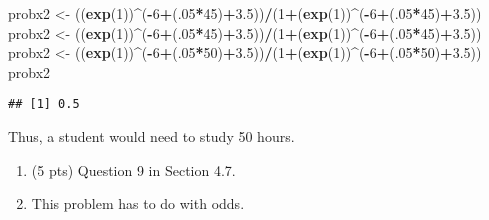 \documentclass[]{article}
\newenvironment{Shaded}{\begin{snugshade}}{\end{snugshade}}
\newcommand{\KeywordTok}[1]{\textcolor[rgb]{0.13,0.29,0.53}{\textbf{#1}}}
\newcommand{\DecValTok}[1]{\textcolor[rgb]{0.00,0.00,0.81}{#1}}
\newcommand{\FloatTok}[1]{\textcolor[rgb]{0.00,0.00,0.81}{#1}}
\newcommand{\StringTok}[1]{\textcolor[rgb]{0.31,0.60,0.02}{#1}}
\newcommand{\OperatorTok}[1]{\textcolor[rgb]{0.81,0.36,0.00}{\textbf{#1}}}
\newcommand{\NormalTok}[1]{#1}
\begin{document}
\begin{Shaded}
\begin{Highlighting}[]
\NormalTok{probx2 <-}\StringTok{ }\NormalTok{((}\KeywordTok{exp}\NormalTok{(}\DecValTok{1}\NormalTok{))}\OperatorTok{^}\NormalTok{(}\OperatorTok{-}\DecValTok{6}\OperatorTok{+}\NormalTok{(.}\DecValTok{05}\OperatorTok{*}\DecValTok{45}\NormalTok{)}\OperatorTok{+}\FloatTok{3.5}\NormalTok{))}\OperatorTok{/}\NormalTok{(}\DecValTok{1}\OperatorTok{+}\NormalTok{(}\KeywordTok{exp}\NormalTok{(}\DecValTok{1}\NormalTok{))}\OperatorTok{^}\NormalTok{(}\OperatorTok{-}\DecValTok{6}\OperatorTok{+}\NormalTok{(.}\DecValTok{05}\OperatorTok{*}\DecValTok{45}\NormalTok{)}\OperatorTok{+}\FloatTok{3.5}\NormalTok{))}
\NormalTok{probx2 <-}\StringTok{ }\NormalTok{((}\KeywordTok{exp}\NormalTok{(}\DecValTok{1}\NormalTok{))}\OperatorTok{^}\NormalTok{(}\OperatorTok{-}\DecValTok{6}\OperatorTok{+}\NormalTok{(.}\DecValTok{05}\OperatorTok{*}\DecValTok{45}\NormalTok{)}\OperatorTok{+}\FloatTok{3.5}\NormalTok{))}\OperatorTok{/}\NormalTok{(}\DecValTok{1}\OperatorTok{+}\NormalTok{(}\KeywordTok{exp}\NormalTok{(}\DecValTok{1}\NormalTok{))}\OperatorTok{^}\NormalTok{(}\OperatorTok{-}\DecValTok{6}\OperatorTok{+}\NormalTok{(.}\DecValTok{05}\OperatorTok{*}\DecValTok{45}\NormalTok{)}\OperatorTok{+}\FloatTok{3.5}\NormalTok{))}
\NormalTok{probx2 <-}\StringTok{ }\NormalTok{((}\KeywordTok{exp}\NormalTok{(}\DecValTok{1}\NormalTok{))}\OperatorTok{^}\NormalTok{(}\OperatorTok{-}\DecValTok{6}\OperatorTok{+}\NormalTok{(.}\DecValTok{05}\OperatorTok{*}\DecValTok{50}\NormalTok{)}\OperatorTok{+}\FloatTok{3.5}\NormalTok{))}\OperatorTok{/}\NormalTok{(}\DecValTok{1}\OperatorTok{+}\NormalTok{(}\KeywordTok{exp}\NormalTok{(}\DecValTok{1}\NormalTok{))}\OperatorTok{^}\NormalTok{(}\OperatorTok{-}\DecValTok{6}\OperatorTok{+}\NormalTok{(.}\DecValTok{05}\OperatorTok{*}\DecValTok{50}\NormalTok{)}\OperatorTok{+}\FloatTok{3.5}\NormalTok{))}
\NormalTok{probx2}
\end{Highlighting}
\end{Shaded}

\begin{verbatim}
## [1] 0.5
\end{verbatim}

Thus, a student would need to study 50 hours.

\begin{enumerate}
\def\labelenumi{\arabic{enumi}.}
\setcounter{enumi}{5}
\item
  (5 pts) Question 9 in Section 4.7.
\item
  This problem has to do with odds.
\end{enumerate}
\end{document}
